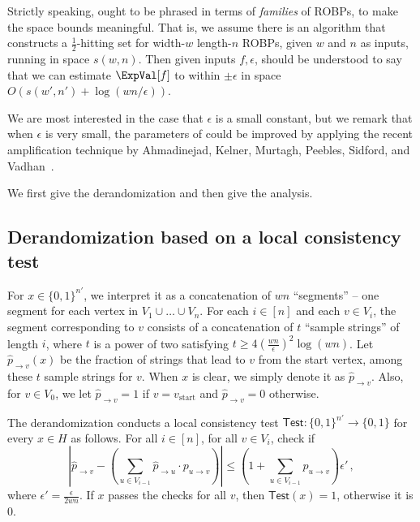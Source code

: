 Strictly speaking,  ought to be phrased in terms of \emph{families} of ROBPs, to make the space bounds meaningful. That is, we assume there is an algorithm that constructs a $\frac{1}{2}$-hitting set for width-$w$ length-$n$ ROBPs, given $w$ and $n$ as inputs, running in space $s(w, n)$. Then given inputs $f, \epsilon$,  should be understood to say that we can estimate $\ExpVal[f]$ to within $\pm \epsilon$ in space $O(s(w', n') + \log(wn/\epsilon))$.

We are most interested in the case that $\epsilon$ is a small constant, but we remark that when $\epsilon$ is very small, the parameters of  could be improved by applying the recent amplification technique by Ahmadinejad, Kelner, Murtagh, Peebles, Sidford, and Vadhan~\cite{AKMPSV20}.

We first give the derandomization and then give the analysis.

\subsection{Derandomization based on a local consistency test} 
\label{subsec:drandBPLgivenHS}

For $x\in \{0,1\}^{n'}$, we interpret it as a concatenation of $wn$ ``segments'' -- one segment for each vertex in $V_1 \cup \dots \cup V_n$. For each $i \in [n]$ and each $v \in V_i$, the segment corresponding to $v$ consists of a concatenation of $t$ ``sample strings'' of length $i$, where $t$ is a power of two satisfying $t \geq 4(\frac{wn }{\epsilon})^2 \log (wn)$. Let $\widehat{p}_{\to v}(x)$ be the fraction of strings that lead to $v$ from the start vertex, among  these $t$ sample strings for $v$. When $x$ is clear, we simply denote it as $\widehat{p}_{\to v}$. Also, for $v \in V_0$, we let $\widehat{p}_{\to v} = 1$ if $v = v_{\text{start}}$ and $\widehat{p}_{\to v} = 0$ otherwise.

The derandomization conducts a local consistency test $\mathsf{Test}:\{0,1\}^{n'} \to \{0,1\}$ for every $x \in H$ as follows. 
For all $i \in [n]$, for all $v \in V_i$,  check if 
\begin{equation} \label{ieq:lct}
\left|\widehat{p}_{\to v} -\left(  \sum_{u \in V_{i-1} } \widehat{p}_{\to u} \cdot p_{u \to v}  \right) \right| \leq \left( 1 + \sum_{u\in V_{i-1}}p_{u\to v} \right) \epsilon'\,,
\end{equation}   
where $\epsilon' = \frac{\epsilon}{2wn}$. If $x$ passes the checks for all $v$, then $\mathsf{Test}(x) = 1$, otherwise it is $0$.

